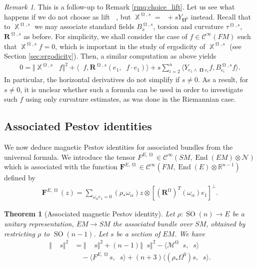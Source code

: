 \documentclass[12pt]{amsart}
\numberwithin{numbering}{section}
\theoremstyle{plain}
\newtheorem{thm}[numbering]{Theorem}
\theoremstyle{definition}
\theoremstyle{remark}
\newtheorem{rmq}[numbering]{Remark}
\numberwithin{equation}{section}
\DeclareMathOperator{\End}{End}
\DeclareMathOperator{\SO}{SO}
\DeclareMathOperator{\nv}{\nabla_{\mathbb{V}}}
\DeclareMathOperator{\xx}{\mathbb{X}}
\DeclareMathOperator{\xs}{\mathbb{X}^{\mg}}
\DeclareMathOperator{\oo}{\mathbf{\Omega}}
\DeclareMathOperator{\mg}{\Omega}
\newcommand{\rfm}{\mathbf{R}}
\newcommand{\rsfm}{\mathbf{R}^{\mg}}
\newcommand{\R}{\mathbb{R}}
\begin{document}
\begin{rmq} \label{rmq:choice_lift_2}
This is a follow-up to Remark \ref{rmq:choice_lift}. Let us see what happens if we do not choose as lift $\xs$, but $\xx^{\mg, s} = \xs + s Y_{\oo^0}$ instead. Recall that to $\xx^{\mg, s}$ we may associate standard fields $B_x^{\mg, s}$, torsion and curvature $\tau^{\mg, s}$, $\rfm^{\mg, s}$ as before. For simplicity, we shall consider the case of $f \in \mathcal{C}^\infty(FM)$ such that $\xx^{\mg, s} f = 0$, which is important in the study of ergodicity of $\xx^{\mg, s}$ (see Section \ref{sec:ergodicity}). Then, a similar computation as above yields 
\begin{align*}
0 = \Vert \xx^{\mg, s} \nv f \Vert^2 + \langle \nv f, \rfm^{\mg, s}(e_1, \nv f \cdot e_1) \rangle + s \sum_{i=2}^n \langle Y_{e_1 \wedge \oo e_i} f, B_{e_i}^{\mg, s} f \rangle.
\end{align*}
In particular, the horizontal derivatives do not simplify if $s \neq 0$. As a result, for $s \neq 0$, it is unclear whether such a formula can be used in order to investigate such $f$ using only curvature estimates, as was done in the Riemannian case. 
\end{rmq}

\subsection{Associated Pestov identities} \label{sec:mag_pestov_tensor}

We now deduce magnetic Pestov identities for associated bundles from the universal formula. We introduce the tensor $F^{E, \mg} \in \mathcal{C}^\infty(SM, \End(EM) \otimes \mathcal{N})$ which is associated with the function $\mathbf{F}^{E, \mg} \in \mathcal{C}^\infty(FM, \End(E) \otimes \R^{n-1})$ defined by 
\begin{align} \label{eq:extra_mag_curv_term}
\mathbf{F}^{E, \mg}(z) = \sum_{\omega_\alpha e_1 = 0} (\rho_* \omega_\alpha) z \otimes [(\rsfm)^T(\omega_\alpha) e_1]^\perp.
\end{align} 

\begin{thm}[Associated magnetic Pestov identity] \label{thm:tensor_mag_pestov}
Let $\rho: \SO(n) \to E$ be a unitary representation, $EM \to SM$ the associated bundle over $SM$, obtained by restricting $\rho$ to $\SO(n-1)$. Let $s$ be a section of $EM$. We have 
\begin{align*}
\Vert \nv \xs s \Vert^2 &= \Vert \xs \nv s \Vert^2 + (n-1) \Vert \xs s \Vert^2 - \langle \mathcal{M}^{\mg} \nv s, \nv s \rangle  \\ 
&\quad - \langle F^{E, \mg} s, \nv s \rangle + (n+3) \langle (\rho_* \Omega^0) s, \xs s \rangle.
\end{align*}
\end{thm}
\end{document}
